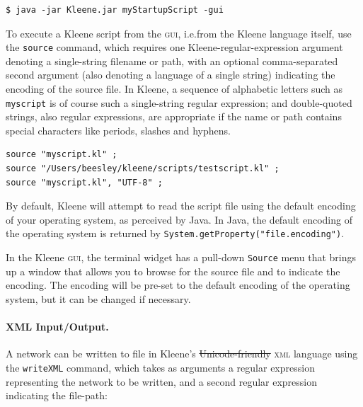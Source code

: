\documentclass[letterpaper,12pt]{article}
\newcommand{\acro}{\textsc}
\begin{document}
\begin{Verbatim}[fontsize=\small]
$ java -jar Kleene.jar myStartupScript -gui
\end{Verbatim}

To execute a Kleene script from the \acro{gui}, i.e.\@ from the Kleene
language itself, use the \texttt{source} command, which requires one
Kleene-regular-expression argument denoting a single-string filename or path,
with an optional comma-separated second argument (also denoting a language of
a single string) indicating the encoding of the source file.  In Kleene, a
sequence of alphabetic letters such as \texttt{myscript} is of course such a
single-string regular expression; and double-quoted strings, also regular
expressions, are appropriate if the name or path contains special characters
like periods, slashes and hyphens.

\begin{Verbatim}[fontsize=\small]
source "myscript.kl" ;
source "/Users/beesley/kleene/scripts/testscript.kl" ;
source "myscript.kl", "UTF-8" ;
\end{Verbatim}

\begin{samepage}
\begin{changebar}

By default, Kleene will attempt to read the script file using the default
encoding of your operating system, as perceived by Java. In Java,
the default encoding of the operating system is returned by
\texttt{System.getProperty("file.encoding")}. 

In the Kleene \acro{gui}, the terminal widget has a pull-down \verb!Source!
menu that brings up a window that allows you to browse for the source file and
to indicate the encoding.  The encoding will be pre-set to the default encoding
of the operating system, but it can be changed if necessary.

\end{changebar}
\end{samepage}

\paragraph{XML Input/Output.}

A network can be written to file in Kleene's \sout{Unicode-friendly}
\acro{xml} language using the \texttt{writeXML} command,
which takes as arguments a regular expression representing the network to be
written, and a second regular expression indicating the file-path:
\end{document}
